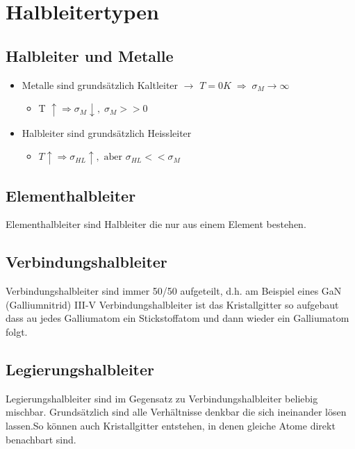 

\section{Halbleitertypen}
	\subsection{Halbleiter und Metalle}
	\begin{itemize}
		\item Metalle sind grundsätzlich Kaltleiter $\rightarrow$ $T=0K \; \Rightarrow \; \sigma_M \rightarrow \infty$
		\begin{itemize}
			\item T $\uparrow \Rightarrow \sigma_M \downarrow, \; \sigma_M >>0$
		\end{itemize}
		\item Halbleiter sind grundsätzlich Heissleiter
		\begin{itemize}
			\item $T\uparrow \Rightarrow \sigma_{HL} \uparrow, \text{ aber } \sigma_{HL} << \sigma_M$
		\end{itemize}
	\end{itemize}
	
	\subsection{Elementhalbleiter} \label{ss_hltyp_ehl}
	Elementhalbleiter sind Halbleiter die nur aus einem Element bestehen.
	\subsection{Verbindungshalbleiter} \label{ss_hltyp_vhl}
	Verbindungshalbleiter sind immer 50/50 aufgeteilt, d.h. am Beispiel eines GaN (Galliumnitrid) III-V Verbindungshalbleiter ist das Kristallgitter so aufgebaut dass au jedes Galliumatom ein Stickstoffatom und dann wieder ein Galliumatom folgt. 
	\subsection{Legierungshalbleiter} \label{ss_hltyp_lhl}
	Legierungshalbleiter sind im Gegensatz zu Verbindungshalbleiter beliebig mischbar. Grundsätzlich sind alle Verhältnisse denkbar die sich ineinander lösen lassen.So können auch Kristallgitter entstehen, in denen gleiche Atome direkt benachbart sind.
	


